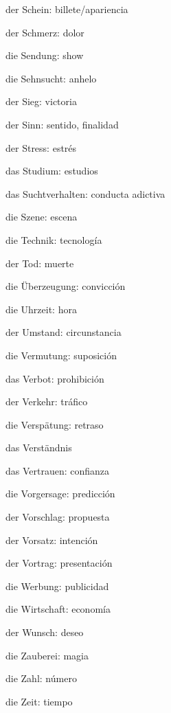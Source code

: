 \begin{multicols}{2}
\begin{myitemize}
\item der Schein: billete/apariencia
\item der Schmerz: dolor
\item die Sendung: show
\item die Sehnsucht: anhelo
\item der Sieg: victoria
\item der Sinn: sentido, finalidad
\item der Stress: estrés
\item das Studium: estudios
\item das Suchtverhalten: conducta adictiva
\item die Szene: escena
\item die Technik: tecnología
\item der Tod: muerte
\item die Überzeugung: convicción
\item die Uhrzeit: hora
\item der Umstand: circunstancia
\item die Vermutung: suposición
\item das Verbot: prohibición
\item der Verkehr: tráfico
\item die Verspätung: retraso
\item das Verständnis
\item das Vertrauen: confianza
\item die Vorgersage: predicción
\item der Vorschlag: propuesta
\item der Vorsatz: intención
\item der Vortrag: presentación
\item die Werbung: publicidad
\item die Wirtschaft: economía
\item der Wunsch: deseo
\item die Zauberei: magia
\item die Zahl: número
\item die Zeit: tiempo
\end{myitemize}
\end{multicols}

